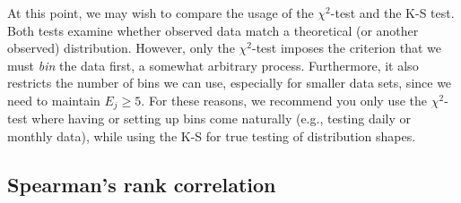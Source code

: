 At this point, we may wish to compare the usage of the $\chi^2$-test and the K-S test. Both tests examine whether observed data match a theoretical
(or another observed) distribution.  However, only the $\chi^2$-test imposes the criterion that we must \emph{bin} the data
first, a somewhat arbitrary process.  Furthermore, it also restricts the number of bins we can use, especially for
smaller data sets, since we need to maintain $E_j \geq 5$.  For these reasons, we recommend you only use the
$\chi^2$-test where having or setting up bins come naturally (e.g., testing daily or monthly data), while using the K-S
for true testing of distribution shapes.


\subsection{Spearman's rank correlation}

